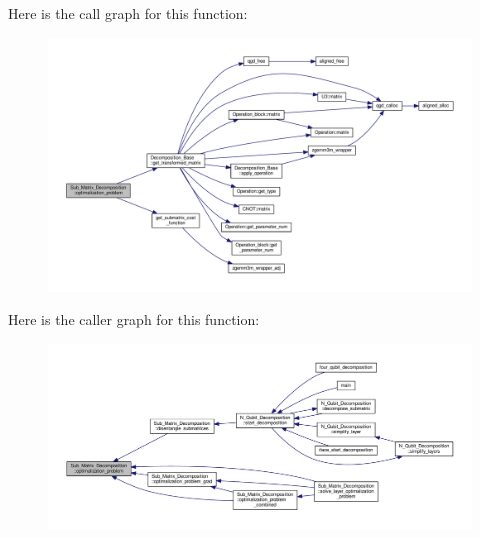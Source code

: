 Here is the call graph for this function\+:
\nopagebreak
\begin{figure}[H]
\begin{center}
\leavevmode
\includegraphics[width=350pt]{class_sub___matrix___decomposition_aea877119fa244d090a1ddc20d2aec431_cgraph}
\end{center}
\end{figure}




Here is the caller graph for this function\+:
\nopagebreak
\begin{figure}[H]
\begin{center}
\leavevmode
\includegraphics[width=350pt]{class_sub___matrix___decomposition_aea877119fa244d090a1ddc20d2aec431_icgraph}
\end{center}
\end{figure}


